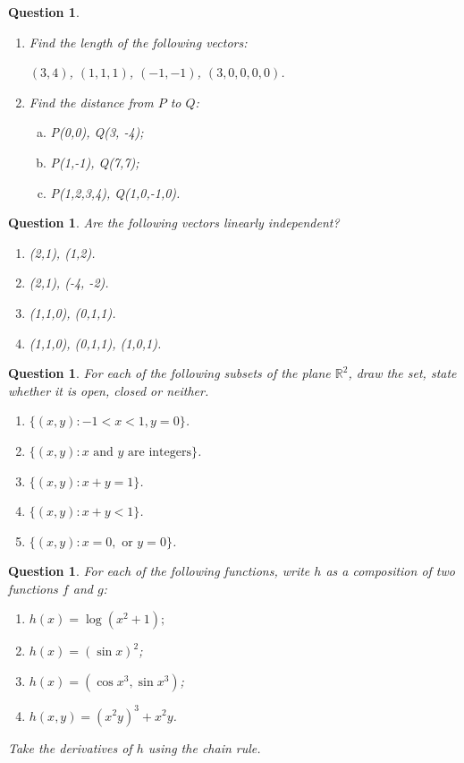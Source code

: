 \documentclass[12pt]{article}
\newtheorem{ques}[theorem]{Question}
\begin{document}
\newpage
\begin{ques}
\begin{enumerate}
    \item Find the length of the following vectors: 
    \par
    $(3, 4)$, $(1,1,1)$, $(-1,-1)$, $(3,0,0,0,0)$.
    \item Find the distance from $P$ to $Q$: 
    \begin{enumerate}[(a)]
        \item P(0,0), Q(3, -4);
        \item P(1,-1), Q(7,7);
        \item P(1,2,3,4), Q(1,0,-1,0).
    \end{enumerate}
    
\end{enumerate}
\end{ques}


\newpage
\begin{ques}

Are the following vectors linearly independent?
\begin{enumerate}
    \item (2,1), (1,2).
    \item (2,1), (-4, -2).
    \item (1,1,0), (0,1,1).
    \item (1,1,0), (0,1,1), (1,0,1).
\end{enumerate}
\end{ques}


\newpage
\begin{ques}
For each of the following subsets of the plane  $\mathbb{R}^2$, draw the set, state whether it is open, closed or neither. 
\begin{enumerate}
    \item $\{(x,y): -1<x<1, y=0\}$.
    \item $\{(x,y): x \text{ and } y \text{ are integers}\}$.
    \item $\{(x,y): x+y=1\}$.
    \item $\{(x,y): x+y<1\}$.
   \item $\{(x,y): x=0,\text{ or } y=0\}$.
\end{enumerate}
\end{ques}


\newpage
\begin{ques}
For each of the following functions, write $h$ as a composition of two functions $f$ and $g$:
\begin{enumerate}
    \item $h(x)=\log (x^2+1);$
    \item $h(x)=(\sin x)^2$;
    \item $h(x)=(\cos x^3, \sin x^3)$;
    \item $h(x,y)=(x^2y)^3+x^2y$.
    
\end{enumerate}

Take the derivatives of $h$ using the chain rule. 
\end{ques}
\end{document}
